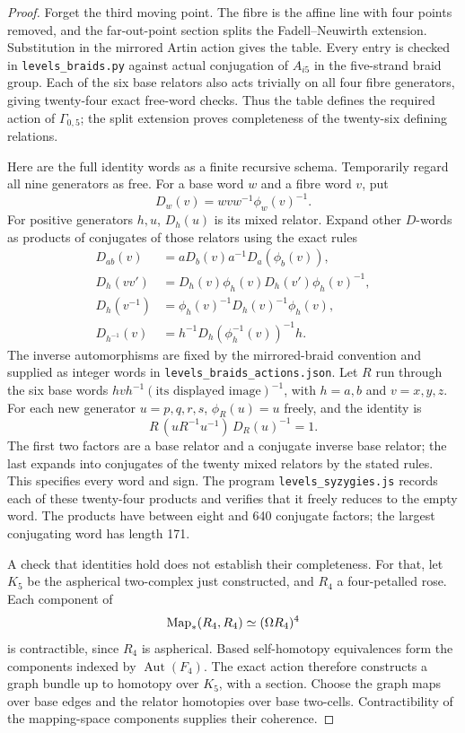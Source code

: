 \begin{proof}
Forget the third moving point. The fibre is
the affine line with four points removed,
and the far-out-point section splits the
Fadell--Neuwirth extension. Substitution in
the mirrored Artin action gives the table.
Every entry is checked in
\texttt{levels\_braids.py} against actual
conjugation of \(A_{i5}\) in the five-strand
braid group. Each of the six base relators
also acts trivially on all four fibre
generators, giving twenty-four exact
free-word checks. Thus the table defines
the required action of \(\Gamma_{0,5}\);
the split extension proves completeness
of the twenty-six defining relations.

Here are the full identity words as a
finite recursive schema. Temporarily
regard all nine generators as free.
For a base word \(w\) and a fibre word
\(v\), put
\[
                  D_w(v)=wvw^{-1}\phi_w(v)^{-1}.
\]
For positive generators \(h,u\), \(D_h(u)\)
is its mixed relator. Expand other
\(D\)-words as products of conjugates
of those relators using the exact rules
\[
\begin{split}
 D_{ab}(v)&=aD_b(v)a^{-1}D_a(\phi_b(v)),\\
 D_h(vv')&=D_h(v)\phi_h(v)D_h(v')\phi_h(v)^{-1},\\
 D_h(v^{-1})&=\phi_h(v)^{-1}D_h(v)^{-1}\phi_h(v),\\
 D_{h^{-1}}(v)&=h^{-1}
                    D_h(\phi_h^{-1}(v))^{-1}h .
\end{split}
\]
The inverse automorphisms are fixed by the
mirrored-braid convention and supplied as
integer words in
\texttt{levels\_braids\_actions.json}.
Let \(R\) run through the six base words
\(hvh^{-1}(\text{its displayed image})^{-1}\),
with \(h=a,b\) and \(v=x,y,z\).
For each new generator \(u=p,q,r,s\),
\(\phi_R(u)=u\) freely, and the identity is
\[
                   R\,(uR^{-1}u^{-1})\,D_R(u)^{-1}=1. \tag{*}
\]
The first two factors are a base relator
and a conjugate inverse base relator;
the last expands into conjugates of the
twenty mixed relators by the stated rules.
This specifies every word and sign.
The program \texttt{levels\_syzygies.js} records each of
these twenty-four products and verifies
that it freely reduces to the empty word.
The products have between eight and 640
conjugate factors; the largest conjugating
word has length 171.

A check that identities hold does not
establish their completeness. For that,
let \(K_5\) be the aspherical two-complex
just constructed, and \(R_4\) a
four-petalled rose. Each component of
\[
              \operatorname{Map}_*(R_4,R_4)\simeq(\Omega R_4)^4
\]
is contractible, since \(R_4\) is
aspherical. Based self-homotopy
equivalences form the components indexed
by \(\operatorname{Aut}(F_4)\).
The exact action therefore constructs
a graph bundle up to homotopy over
\(K_5\), with a section. Choose the
graph maps over base edges and the
relator homotopies over base two-cells.
Contractibility of the mapping-space
components supplies their coherence.


\end{proof}

